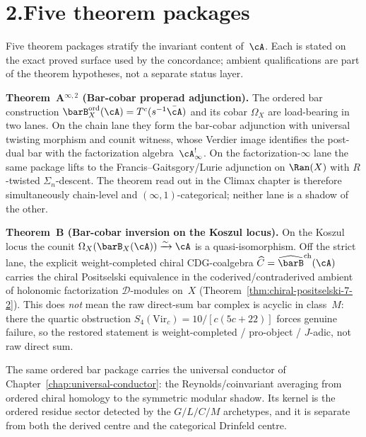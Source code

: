 \section*{2.\quad Five theorem packages}

\noindent
Five theorem packages stratify the invariant content of~$\cA$.
Each is stated on the exact proved surface used by the concordance;
ambient qualifications are part of the theorem hypotheses, not a
separate status layer.

\medskip

\noindent\textbf{Theorem~A$^{\infty,2}$ (Bar-cobar properad
adjunction).}\enspace
The ordered bar construction
$\barB^{\mathrm{ord}}_X(\cA) = T^c(s^{-1}\bar\cA)$
and its cobar $\Omega_X$ are load-bearing in two lanes. On the chain
lane they form the bar-cobar adjunction with universal twisting
morphism and counit witness, whose Verdier image identifies the
post-dual bar with the factorization algebra~$\cA^{!}_\infty$.
On the factorization-$\infty$ lane the same package lifts to the
Francis--Gaitsgory/Lurie adjunction on $\Ran(X)$ with
$R$-twisted $\Sigma_n$-descent. The theorem read out in the Climax
chapter is therefore simultaneously chain-level and
$(\infty,1)$-categorical; neither lane is a shadow of the other.

\medskip

\noindent\textbf{Theorem~B (Bar-cobar inversion on the Koszul
locus).}\enspace
On the Koszul locus the counit
$\Omega_X(\barB_X(\cA))\xrightarrow{\sim}\cA$ is a
quasi-isomorphism. Off the strict lane, the explicit
weight-completed chiral CDG-coalgebra
$\widehat{C}=\widehat{\barB}^{\mathrm{ch}}(\cA)$ carries the chiral
Positselski equivalence in the coderived/contraderived ambient of
holonomic factorization $\mathcal{D}$-modules on~$X$
\textup{(}Theorem~\ref{thm:chiral-positselski-7-2}\textup{)}.
This does \emph{not} mean the raw direct-sum bar complex is acyclic in
class~$M$: there the quartic obstruction
$S_4(\mathrm{Vir}_c)=10/[c(5c+22)]$ forces genuine failure, so the
restored statement is weight-completed / pro-object / $J$-adic, not
raw direct sum.

The same ordered bar package carries the universal conductor of
Chapter~\ref{chap:universal-conductor}: the Reynolds/coinvariant
averaging from ordered chiral homology to the symmetric modular
shadow. Its kernel is the ordered residue sector detected by the
$G/L/C/M$ archetypes, and it is separate from both the derived centre
and the categorical Drinfeld centre.

